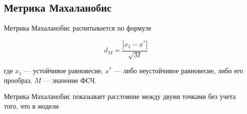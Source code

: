 \subsection{Метрика Махаланобис}
        

    Метрика Махаланобис расчитывается по формуле 

    \[d_M = \frac{|x_1 - x^*|}{\sqrt{M}}\]
        
    где \(x_1\) --- устойчивое равновесие, \(x^*\) --- либо неустойчивое равновесие, либо его прообраз. \(M\) --- значение ФСЧ.

    Метрика Махаланобис показывает расстояние между двумя точками без учета того, что в модели 


